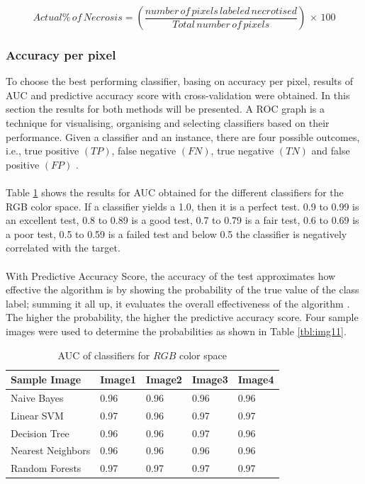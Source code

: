 \documentclass[conference]{IEEEtran}
\begin{document}
\begin{equation}\label{act}

 Actual\%\,of\,Necrosis = \left(\frac{ number\, of\, pixels\, labeled\, necrotised}{Total\, number\, of\, pixels}\right)\,\times\,100
\end{equation}

\subsubsection{Accuracy per pixel}
To choose the best performing classifier, basing on accuracy per pixel, results of AUC and predictive accuracy score with cross-validation were obtained. In this section the results for both methods will be presented. A ROC graph is a technique for visualising, organising and selecting classifiers based on their performance. Given a classifier and an instance, there are four possible outcomes, i.e., true positive $(TP)$, false negative $(FN)$, true negative $(TN)$ and false positive $(FP)$ \cite{fawcett2006introduction}. \\ \\Table \ref{tbl:img1} shows the results for AUC obtained for the different classifiers for the RGB color space. If a classifier yields a 1.0, then it is a perfect test. 0.9 to 0.99 is an excellent test, 0.8 to 0.89 is a good test, 0.7 to 0.79 is a fair test, 0.6 to 0.69 is a poor test, 0.5 to 0.59 is a failed test and below 0.5 the classifier is negatively correlated with the target. \\ \\With Predictive Accuracy Score, the accuracy of the test approximates how effective the algorithm is by showing the probability of the true value of the class label; summing it all up, it evaluates the overall effectiveness of the algorithm \cite{sokolova2006beyond}. The higher the probability, the higher the predictive accuracy score. Four sample images were used to determine the probabilities as shown in Table \ref{tbl:img11}.

\begin{table}[t!]
\renewcommand{\arraystretch}{1.3}
\caption{AUC of classifiers for $RGB$ color space }
\centering
    \begin{tabular}{|l|l|l|l|l|}
      \hline
      Sample Image &Image1 &Image2 & Image3 & Image4 \\ \hline

      Naive Bayes & 0.96  & 0.96 & 0.96 & 0.96 \\    \hline
      Linear SVM & 0.97  & 0.96 & 0.97 & 0.97 \\      \hline
      Decision Tree & 0.96  & 0.96 & 0.97 & 0.96 \\      \hline
      Nearest Neighbors & 0.96  & 0.96 & 0.96 & 0.96 \\      \hline
      Random Forests & 0.97  & 0.97& 0.97 & 0.97 \\      \hline
     \end{tabular}
    \label{tbl:img1}
\end{table}
\end{document}
